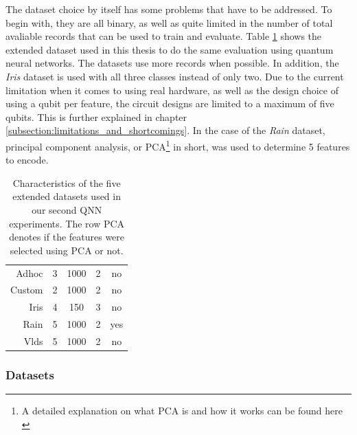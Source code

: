 The dataset choice by itself has some problems that have to be addressed. To begin with, they are all binary, as well as quite limited in the number of total avaliable records that can be used to train and evaluate. Table \ref{table:qnn_extended_datasets} shows the extended dataset used in this thesis to do the same evaluation using quantum neural networks. The datasets use more records when possible. In addition, the \emph{Iris} dataset is used with all three classes instead of only two. Due to the current limitation when it comes to using real hardware, as well as the design choice of using a qubit per feature, the circuit designs are limited to a maximum of five qubits. This is further explained in chapter \ref{subsection:limitations_and_shortcomings}. In the case of the \emph{Rain} dataset, principal component analysis, or PCA\footnote{A detailed explanation on what PCA is and how it works can be found here \cite{bro2014principal}} in short, was used to determine 5 features to encode.

\begin{table}[!h]
	\centering
	\begin{tabular}{rcccc}
		\hline 
		\thead{\textbf{Dataset}} & \thead{\textbf{\#Features}} & \thead{\textbf{\#Records}} & \thead{\textbf{\#Classes}} & \thead{\textbf{PCA}} \\
		\hline 
		Adhoc   & 3         & 1000      & 2          & no        \\
		Custom  & 2         & 1000      & 2          & no        \\
		Iris    & 4         & 150       & 3          & no        \\
		Rain    & 5         & 1000      & 2          & yes       \\
		Vlds    & 5         & 1000      & 2          & no        \\
		\hline
	\end{tabular}
	\caption{Characteristics of the five extended datasets used in our second QNN experiments. The row PCA denotes if the features were selected using PCA or not.}
	\label{table:qnn_extended_datasets}
\end{table}

\clearpage

\subsubsection{Datasets}

